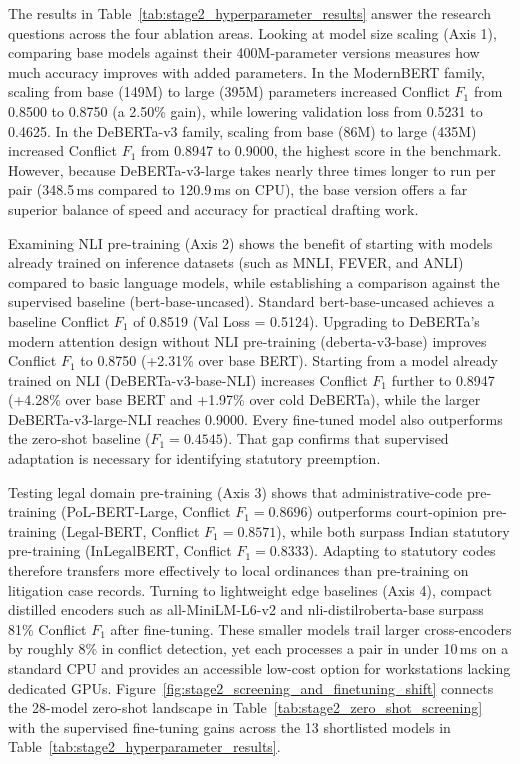 The results in Table~\ref{tab:stage2_hyperparameter_results} answer the research questions across the four ablation areas. Looking at model size scaling (Axis 1), comparing base models against their 400M-parameter versions measures how much accuracy improves with added parameters. In the ModernBERT family, scaling from base (149M) to large (395M) parameters increased Conflict $F_1$ from 0.8500 to 0.8750 (a 2.50\% gain), while lowering validation loss from 0.5231 to 0.4625. In the DeBERTa-v3 family, scaling from base (86M) to large (435M) increased Conflict $F_1$ from 0.8947 to 0.9000, the highest score in the benchmark. However, because DeBERTa-v3-large takes nearly three times longer to run per pair (348.5\,ms compared to 120.9\,ms on CPU), the base version offers a far superior balance of speed and accuracy for practical drafting work.

Examining NLI pre-training (Axis 2) shows the benefit of starting with models already trained on inference datasets (such as MNLI, FEVER, and ANLI) compared to basic language models, while establishing a comparison against the supervised baseline (bert-base-uncased). Standard bert-base-uncased achieves a baseline Conflict $F_1$ of 0.8519 (Val Loss = 0.5124). Upgrading to DeBERTa's modern attention design without NLI pre-training (deberta-v3-base) improves Conflict $F_1$ to 0.8750 (+2.31\% over base BERT). Starting from a model already trained on NLI (DeBERTa-v3-base-NLI) increases Conflict $F_1$ further to 0.8947 (+4.28\% over base BERT and +1.97\% over cold DeBERTa), while the larger DeBERTa-v3-large-NLI reaches 0.9000. Every fine-tuned model also outperforms the zero-shot baseline ($F_1 = 0.4545$). That gap confirms that supervised adaptation is necessary for identifying statutory preemption.

Testing legal domain pre-training (Axis 3) shows that administrative-code pre-training (PoL-BERT-Large, Conflict $F_1 = 0.8696$) outperforms court-opinion pre-training (Legal-BERT, Conflict $F_1 = 0.8571$), while both surpass Indian statutory pre-training (InLegalBERT, Conflict $F_1 = 0.8333$). Adapting to statutory codes therefore transfers more effectively to local ordinances than pre-training on litigation case records. Turning to lightweight edge baselines (Axis 4), compact distilled encoders such as all-MiniLM-L6-v2 and nli-distilroberta-base surpass 81\% Conflict $F_1$ after fine-tuning. These smaller models trail larger cross-encoders by roughly 8\% in conflict detection, yet each processes a pair in under 10\,ms on a standard CPU and provides an accessible low-cost option for workstations lacking dedicated GPUs. Figure~\ref{fig:stage2_screening_and_finetuning_shift} connects the 28-model zero-shot landscape in Table~\ref{tab:stage2_zero_shot_screening} with the supervised fine-tuning gains across the 13 shortlisted models in Table~\ref{tab:stage2_hyperparameter_results}.

